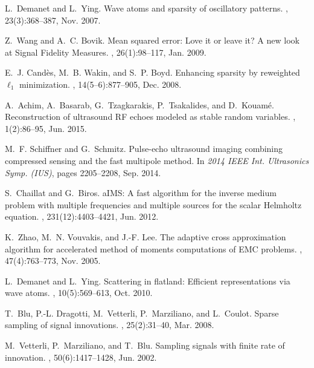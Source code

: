 \documentclass[10pt,twocolumn,romanappendices,final]{IEEEtran}
\begin{document}
\begin{thebibliography}{100}
L.~Demanet and L.~Ying.
\newblock Wave atoms and sparsity of oscillatory patterns.
, 23(3):368--387, Nov. 2007.

Z.~Wang and A.~C. Bovik.
\newblock Mean squared error: {L}ove it or leave it? {A} new look at {S}ignal
  {F}idelity {M}easures.
, 26(1):98--117, Jan. 2009.

E.~J. Candès, M.~B. Wakin, and S.~P. Boyd.
\newblock Enhancing sparsity by reweighted {$\ell_{1}$} minimization.
, 14(5--6):877--905, Dec. 2008.

A.~Achim, A.~Basarab, G.~Tzagkarakis, P.~Tsakalides, and D.~Kouamé.
\newblock Reconstruction of ultrasound {RF} echoes modeled as stable random
  variables.
, 1(2):86--95, Jun. 2015.

M.~F. Schiffner and G.~Schmitz.
\newblock Pulse-echo ultrasound imaging combining compressed sensing and the
  fast multipole method.
\newblock In {\em 2014 IEEE Int. Ultrasonics Symp. (IUS)}, pages 2205--2208,
  Sep. 2014.

S.~Chaillat and G.~Biros.
a{IMS}: {A} fast algorithm for the inverse medium problem with
  multiple frequencies and multiple sources for the scalar {H}elmholtz
  equation.
, 231(12):4403--4421, Jun. 2012.

K.~Zhao, M.~N. Vouvakis, and J.-F. Lee.
\newblock The adaptive cross approximation algorithm for accelerated method of
  moments computations of {EMC} problems.
, 47(4):763--773, Nov. 2005.

L.~Demanet and L.~Ying.
\newblock Scattering in flatland: {E}fficient representations via wave atoms.
, 10(5):569--613, Oct. 2010.

T.~Blu, P.-L. Dragotti, M.~Vetterli, P.~Marziliano, and L.~Coulot.
\newblock Sparse sampling of signal innovations.
, 25(2):31--40, Mar. 2008.

M.~Vetterli, P.~Marziliano, and T.~Blu.
\newblock Sampling signals with finite rate of innovation.
, 50(6):1417--1428, Jun. 2002.


\end{thebibliography}
\end{document}
